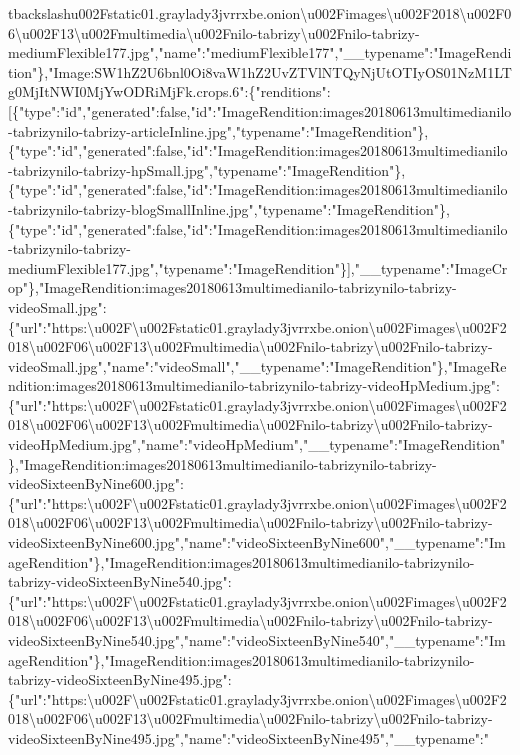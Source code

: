 tbackslash{}u002Fstatic01.graylady3jvrrxbe.onion\textbackslash{}u002Fimages\textbackslash{}u002F2018\textbackslash{}u002F06\textbackslash{}u002F13\textbackslash{}u002Fmultimedia\textbackslash{}u002Fnilo-tabrizy\textbackslash{}u002Fnilo-tabrizy-mediumFlexible177.jpg","name":"mediumFlexible177","\_\_typename":"ImageRendition"\},"Image:SW1hZ2U6bnl0Oi8vaW1hZ2UvZTVlNTQyNjUtOTIyOS01NzM1LTg0MjItNWI0MjYwODRiMjFk.crops.6":\{"renditions":{[}\{"type":"id","generated":false,"id":"ImageRendition:images20180613multimedianilo-tabrizynilo-tabrizy-articleInline.jpg","typename":"ImageRendition"\},\{"type":"id","generated":false,"id":"ImageRendition:images20180613multimedianilo-tabrizynilo-tabrizy-hpSmall.jpg","typename":"ImageRendition"\},\{"type":"id","generated":false,"id":"ImageRendition:images20180613multimedianilo-tabrizynilo-tabrizy-blogSmallInline.jpg","typename":"ImageRendition"\},\{"type":"id","generated":false,"id":"ImageRendition:images20180613multimedianilo-tabrizynilo-tabrizy-mediumFlexible177.jpg","typename":"ImageRendition"\}{]},"\_\_typename":"ImageCrop"\},"ImageRendition:images20180613multimedianilo-tabrizynilo-tabrizy-videoSmall.jpg":\{"url":"https:\textbackslash{}u002F\textbackslash{}u002Fstatic01.graylady3jvrrxbe.onion\textbackslash{}u002Fimages\textbackslash{}u002F2018\textbackslash{}u002F06\textbackslash{}u002F13\textbackslash{}u002Fmultimedia\textbackslash{}u002Fnilo-tabrizy\textbackslash{}u002Fnilo-tabrizy-videoSmall.jpg","name":"videoSmall","\_\_typename":"ImageRendition"\},"ImageRendition:images20180613multimedianilo-tabrizynilo-tabrizy-videoHpMedium.jpg":\{"url":"https:\textbackslash{}u002F\textbackslash{}u002Fstatic01.graylady3jvrrxbe.onion\textbackslash{}u002Fimages\textbackslash{}u002F2018\textbackslash{}u002F06\textbackslash{}u002F13\textbackslash{}u002Fmultimedia\textbackslash{}u002Fnilo-tabrizy\textbackslash{}u002Fnilo-tabrizy-videoHpMedium.jpg","name":"videoHpMedium","\_\_typename":"ImageRendition"\},"ImageRendition:images20180613multimedianilo-tabrizynilo-tabrizy-videoSixteenByNine600.jpg":\{"url":"https:\textbackslash{}u002F\textbackslash{}u002Fstatic01.graylady3jvrrxbe.onion\textbackslash{}u002Fimages\textbackslash{}u002F2018\textbackslash{}u002F06\textbackslash{}u002F13\textbackslash{}u002Fmultimedia\textbackslash{}u002Fnilo-tabrizy\textbackslash{}u002Fnilo-tabrizy-videoSixteenByNine600.jpg","name":"videoSixteenByNine600","\_\_typename":"ImageRendition"\},"ImageRendition:images20180613multimedianilo-tabrizynilo-tabrizy-videoSixteenByNine540.jpg":\{"url":"https:\textbackslash{}u002F\textbackslash{}u002Fstatic01.graylady3jvrrxbe.onion\textbackslash{}u002Fimages\textbackslash{}u002F2018\textbackslash{}u002F06\textbackslash{}u002F13\textbackslash{}u002Fmultimedia\textbackslash{}u002Fnilo-tabrizy\textbackslash{}u002Fnilo-tabrizy-videoSixteenByNine540.jpg","name":"videoSixteenByNine540","\_\_typename":"ImageRendition"\},"ImageRendition:images20180613multimedianilo-tabrizynilo-tabrizy-videoSixteenByNine495.jpg":\{"url":"https:\textbackslash{}u002F\textbackslash{}u002Fstatic01.graylady3jvrrxbe.onion\textbackslash{}u002Fimages\textbackslash{}u002F2018\textbackslash{}u002F06\textbackslash{}u002F13\textbackslash{}u002Fmultimedia\textbackslash{}u002Fnilo-tabrizy\textbackslash{}u002Fnilo-tabrizy-videoSixteenByNine495.jpg","name":"videoSixteenByNine495","\_\_typename":"